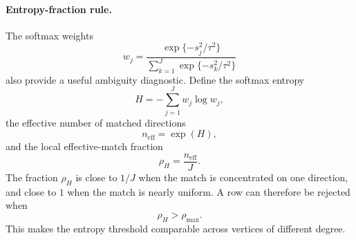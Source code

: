 \documentclass[11pt]{article}
\begin{document}
\paragraph{Entropy-fraction rule.}
The softmax weights
\[
  w_j
  =
  \frac{\exp\{-s_j^2/\tau^2\}}
       {\sum_{k=1}^J\exp\{-s_k^2/\tau^2\}}
\]
also provide a useful ambiguity diagnostic.  Define the softmax entropy
\[
  H=-\sum_{j=1}^J w_j\log w_j,
\]
the effective number of matched directions
\[
  n_{\mathrm{eff}}=\exp(H),
\]
and the local effective-match fraction
\[
  \rho_H=\frac{n_{\mathrm{eff}}}{J}.
\]
The fraction \(\rho_H\) is close to \(1/J\) when the match is concentrated on
one direction, and close to \(1\) when the match is nearly uniform.  A row can
therefore be rejected when
\[
  \rho_H>\rho_{\max}.
\]
This makes the entropy threshold comparable across vertices of different
degree.
\end{document}
